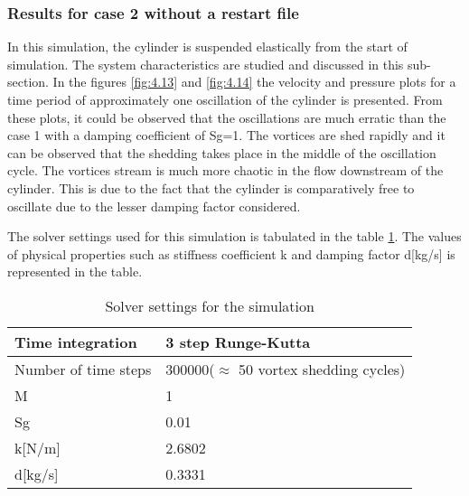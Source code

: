 \subsubsection{Results for case 2 without a restart file}
In this simulation, the cylinder is suspended elastically from the start of simulation. The system characteristics are studied and discussed in this sub-section. In the figures \ref{fig:4.13} and \ref{fig:4.14} the velocity and pressure plots for a time period of approximately one oscillation of the cylinder is presented. From these plots, it could be observed that the oscillations are much erratic than the case 1 with a damping coefficient of Sg=1. The vortices are shed rapidly and it can be observed that the shedding takes place in the middle of the oscillation cycle. The vortices stream is much more chaotic in the flow downstream of the cylinder. This is due to the fact that the cylinder is comparatively free to oscillate due to the lesser damping factor considered. 

The solver settings used for this simulation is tabulated in the table \ref{table:4.9}. The values of  physical properties such as stiffness coefficient k and damping factor d[kg/s] is represented in the table.

\begin{table}[htbp]
  \centering
   \begin{tabular}{|l|l|}
    \hline
    Time integration & 3 step Runge-Kutta \\
    \hline
    Number of time steps & \multicolumn{1}{p{8.645em}|}{300000\newline{}($\approx$ 50 vortex shedding cycles)} \\
    \hline
    M     & 1 \\
    \hline
    Sg    & 0.01 \\
    \hline
    k[N/m]     & 2.6802 \\
    \hline
    d[kg/s]     & 0.3331 \\
    \hline
    \end{tabular}%
  \caption{Solver settings for the simulation}
  \label{table:4.9}%
\end{table}%

